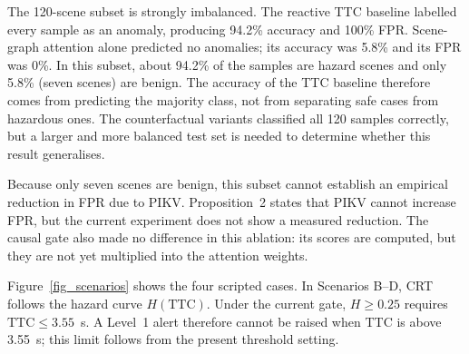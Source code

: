 
The 120-scene subset is strongly imbalanced. The reactive TTC baseline labelled every sample as an anomaly, producing 94.2\% accuracy and 100\% FPR. Scene-graph attention alone predicted no anomalies; its accuracy was 5.8\% and its FPR was 0\%. In this subset, about 94.2\% of the samples are hazard scenes and only 5.8\% (seven scenes) are benign. The accuracy of the TTC baseline therefore comes from predicting the majority class, not from separating safe cases from hazardous ones. The counterfactual variants classified all 120 samples correctly, but a larger and more balanced test set is needed to determine whether this result generalises.

Because only seven scenes are benign, this subset cannot establish an empirical reduction in FPR due to PIKV. Proposition~2 states that PIKV cannot increase FPR, but the current experiment does not show a measured reduction. The causal gate also made no difference in this ablation: its scores are computed, but they are not yet multiplied into the attention weights.

Figure~\ref{fig_scenarios} shows the four scripted cases. In Scenarios B--D, CRT follows the hazard curve $H(\text{TTC})$. Under the current gate, $H \ge 0.25$ requires $\text{TTC} \le 3.55$~s. A Level~1 alert therefore cannot be raised when TTC is above 3.55~s; this limit follows from the present threshold setting.

\begin{table}[H]
\caption{Measured behaviour of PC-CSG on the four scripted demo scenarios.}
\centering
\label{table_scenarios}
\end{table}

